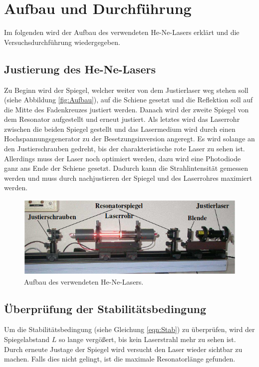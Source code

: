 \section{Aufbau und Durchführung}
\label{sec:Durchführung}
Im folgenden wird der Aufbau des verwendeten He-Ne-Lasers erklärt und die Versuchsdurchführung wiedergegeben.

\subsection{Justierung des He-Ne-Lasers}
Zu Beginn wird der Spiegel, welcher weiter von dem Justierlaser weg stehen soll (siehe Abbildung \eqref{fig:Aufbau}), auf die Schiene gesetzt und die Reflektion soll auf die Mitte des Fadenkreuzes justiert werden. Danach wird der zweite Spiegel von dem Resonator aufgestellt und erneut justiert. Als letztes wird das Laserrohr zwischen die beiden Spiegel gestellt und das Lasermedium wird durch einen Hochspannungsgenerator zu der Besetzungsinversion angeregt. Es wird solange an den Justierschrauben gedreht, bis der charakteristische rote Laser zu sehen ist. Allerdings muss der Laser noch optimiert werden, dazu wird eine Photodiode ganz ans Ende der Schiene gesetzt. Dadurch kann die Strahlintensität gemessen werden und muss durch nachjustieren der Spiegel und des Laserrohres maximiert werden.

\begin{figure}[H]
  \includegraphics[width=\linewidth]{Bilder/Aufbau.png}
  \caption{Aufbau des verwendeten He-Ne-Lasers. \cite{V61}}
  \label{fig:Aufbau}
\end{figure}

\subsection{Überprüfung der Stabilitätsbedingung}
Um die Stabilitätsbedingung (siehe Gleichung \eqref{eqn:Stab}) zu überprüfen, wird der Spiegelabstand $L$ so lange vergößert, bis kein Laserstrahl mehr zu sehen ist. Durch erneute Justage der Spiegel wird versucht den Laser wieder sichtbar zu machen. Falls dies nicht gelingt, ist die maximale Resonatorlänge gefunden.

